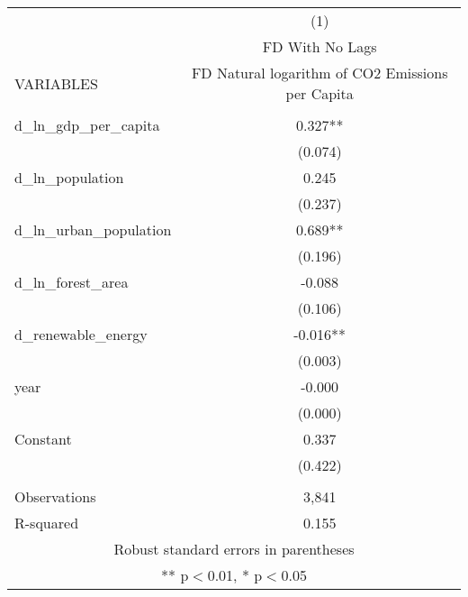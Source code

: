 \begin{tabular}{lc} \hline
 & (1) \\
 & FD With No Lags \\
VARIABLES & FD Natural logarithm of CO2 Emissions per Capita \\ \hline
 &  \\
d\_ln\_gdp\_per\_capita & 0.327** \\
 & (0.074) \\
d\_ln\_population & 0.245 \\
 & (0.237) \\
d\_ln\_urban\_population & 0.689** \\
 & (0.196) \\
d\_ln\_forest\_area & -0.088 \\
 & (0.106) \\
d\_renewable\_energy & -0.016** \\
 & (0.003) \\
year & -0.000 \\
 & (0.000) \\
Constant & 0.337 \\
 & (0.422) \\
 &  \\
Observations & 3,841 \\
 R-squared & 0.155 \\ \hline
\multicolumn{2}{c}{ Robust standard errors in parentheses} \\
\multicolumn{2}{c}{ ** p$<$0.01, * p$<$0.05} \\
\end{tabular}
